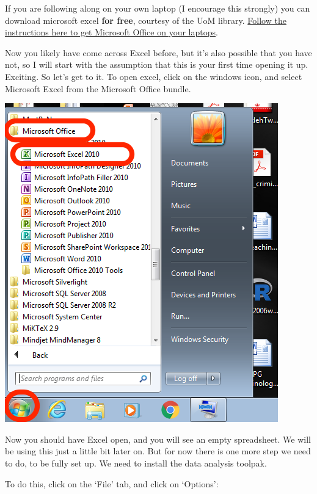 \documentclass[]{book}
\theoremstyle{definition}
\theoremstyle{definition}
\theoremstyle{definition}
\theoremstyle{remark}
\begin{document}
If you are following along on your own laptop (I encourage this
strongly) you can download microsoft excel \textbf{for free}, courtesy
of the UoM library.
\href{http://www.itservices.manchester.ac.uk/students/office365/}{Follow
the instructions here to get Microsoft Office on your laptops}.

Now you likely have come across Excel before, but it's also possible
that you have not, so I will start with the assumption that this is your
first time opening it up. Exciting. So let's get to it. To open excel,
click on the windows icon, and select Microsoft Excel from the Microsoft
Office bundle.

\includegraphics{imgs/open_excel.png}

Now you should have Excel open, and you will see an empty spreadsheet.
We will be using this just a little bit later on. But for now there is
one more step we need to do, to be fully set up. We need to install the
data analysis toolpak.

To do this, click on the `File' tab, and click on `Options':
\end{document}
